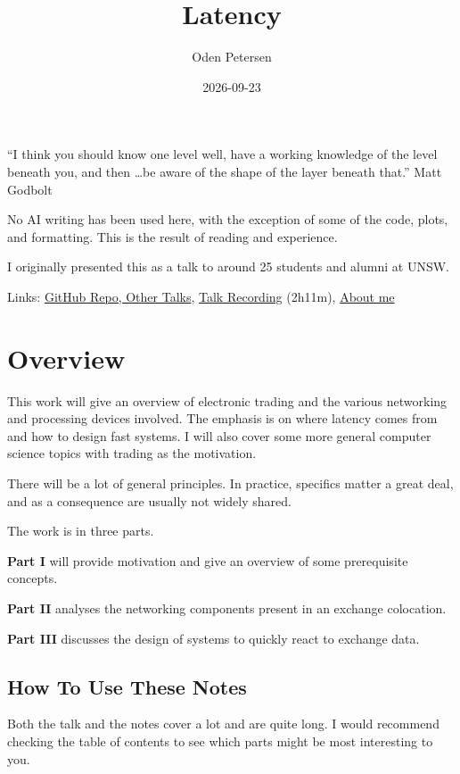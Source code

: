 \documentclass{article}
\title{Latency}
\author{Oden Petersen}
\date{2026-09-23}
\begin{document}
\maketitle

\begin{center}
	``I think you should know one level well, have a working knowledge of the level beneath you, and then \ldots be aware of the shape of the layer beneath that.'' Matt Godbolt
\end{center}

No AI writing has been used here, with the exception of some of the code, plots, and formatting. This is the result of reading and experience.

I originally presented this as a talk to around 25 students and alumni at UNSW.

Links: \textcolor{blue}{\href{https://github.com/odenpetersen/trading-presentation}{GitHub Repo, Other Talks}}, \textcolor{blue}{\href{https://www.youtube.com/watch?v=GHZncZyFnqo}{Talk Recording}} (2h11m), \textcolor{blue}{\href{http://linkedin.com/in/oden-petersen}{About me}}
\section*{Overview}
This work will give an overview of electronic trading and the various networking and processing devices involved. The emphasis is on where latency comes from and how to design fast systems. I will also cover some more general computer science topics with trading as the motivation.

There will be a lot of general principles. In practice, specifics matter a great deal, and as a consequence are usually not widely shared.

The work is in three parts.

\textbf{Part I} will provide motivation and give an overview of some prerequisite concepts.

\textbf{Part II} analyses the networking components present in an exchange colocation.

\textbf{Part III} discusses the design of systems to quickly react to exchange data.

\subsection*{How To Use These Notes}
Both the talk and the notes cover a lot and are quite long. I would recommend checking the table of contents to see which parts might be most interesting to you.
\end{document}
